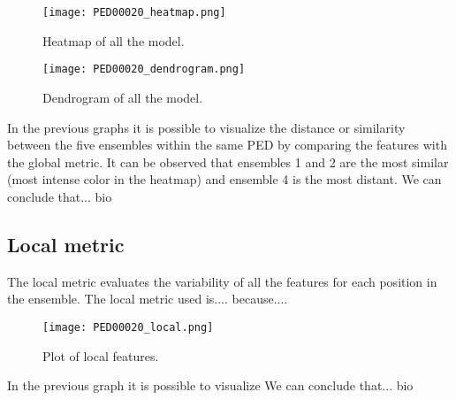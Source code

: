 \begin{figure}[H]
	\begin{minipage}[b]{0.9\textwidth}
		\centering
		\texttt{[image: PED00020\_heatmap.png]}
		\caption{Heatmap of all the model.}
		\label{heatmap}
	\end{minipage}
	\hfill
	\begin{minipage}[b]{0.9\textwidth}
		\centering
		\texttt{[image: PED00020\_dendrogram.png]}
		\caption{Dendrogram of all the model.}
		\label{dendrogram}
	\end{minipage}
\end{figure}

In the previous graphs it is possible to visualize the distance or similarity between the five ensembles within the same PED by comparing the features with the global metric. It can be observed that ensembles 1 and 2 are the most similar (most intense color in the heatmap) and ensemble 4 is the most distant.
We can conclude that... bio


\subsection{Local metric}
The local metric evaluates the variability of all the features for each position in the ensemble.
The local metric used is.... because....

\begin{figure}[H]
	\begin{minipage}[b]{0.9\textwidth}
		\centering
		\texttt{[image: PED00020\_local.png]}
		\caption{Plot of local features.}
		\label{plot}
	\end{minipage}	
\end{figure}
In the previous graph it is possible to visualize
We can conclude that... bio